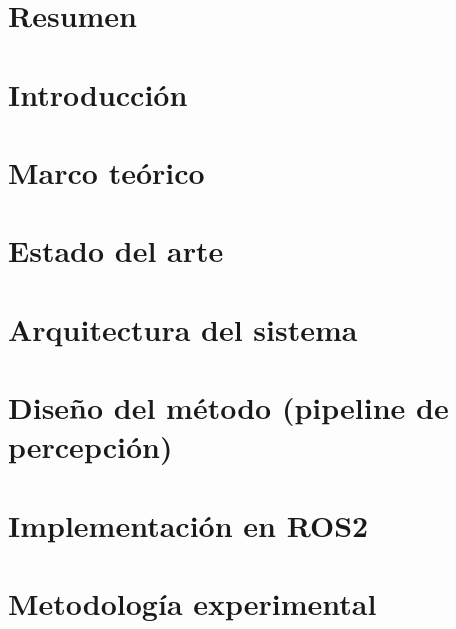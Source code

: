 
\chapter*{Resumen}



\chapter{Introducción}



\chapter{Marco teórico}
\label{chap:marco-teorico}


\chapter{Estado del arte}
\label{chap:estado-arte}


\chapter{Arquitectura del sistema}

\label{chap:arquitectura}


\chapter{Diseño del método (pipeline de percepción)}
\label{chap:metodo}


\chapter{Implementación en ROS2}
\label{chap:implementacion}


\chapter{Metodología experimental}
\label{chap:experimentos}


